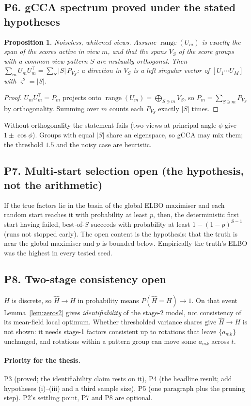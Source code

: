\documentclass[11pt,a4paper]{article}
\newtheorem{proposition}{Proposition}
\theoremstyle{definition}
\theoremstyle{remark}
\begin{document}
\subsection*{P6. gCCA spectrum \hfill\textbf{proved} under the stated hypotheses}
\begin{proposition}\label{prop:gcca}
Noiseless, whitened views. Assume $\operatorname{range}(U_m)$ is exactly the span of the scores active in view $m$, and that
the spans $V_S$ of the score groups with a common view pattern $S$ are mutually orthogonal. Then
$\sum_mU_mU_m^\top=\sum_S|S|\,P_{V_S}$: a direction in $V_S$ is a left singular vector of $[U_1\cdots U_M]$ with $\varsigma^2=|S|$.
\end{proposition}
\begin{proof}
$U_mU_m^\top=P_m$ projects onto $\operatorname{range}(U_m)=\bigoplus_{S\ni m}V_S$, so $P_m=\sum_{S\ni m}P_{V_S}$ by orthogonality. Summing over
$m$ counts each $P_{V_S}$ exactly $|S|$ times. \qedhere
\end{proof}
\noindent Without orthogonality the statement fails (two views at principal angle $\phi$ give $1\pm\cos\phi$). Groups with
equal $|S|$ share an eigenspace, so gCCA may mix them; the threshold $1.5$ and the noisy case are heuristic.

\subsection*{P7. Multi-start selection \hfill\textbf{open} (the hypothesis, not the arithmetic)}
If the true factors lie in the basin of the global ELBO maximiser and each random start reaches it with probability at
least $p$, then, the deterministic first start having failed, best-of-$S$ succeeds with probability at least
$1-(1-p)^{S-1}$ (runs not stopped early). The open content is the hypothesis: that the truth is near the global maximiser
and $p$ is bounded below. Empirically the truth's ELBO was the highest in every tested seed.

\subsection*{P8. Two-stage consistency \hfill\textbf{open}}
$H$ is discrete, so $\hat H\to H$ in probability means $P(\hat H=H)\to1$. On that event Lemma~\ref{lem:zeros2} gives
\emph{identifiability} of the stage-2 model, not consistency of its mean-field local optimum. Whether thresholded
variance shares give $\hat H\to H$ is not shown: it needs stage-1 factors consistent up to rotations that leave $\{a_{mk}\}$
unchanged, and rotations within a pattern group can move some $a_{mk}$ across $t$.

\paragraph{Priority for the thesis.} P3 (proved; the identifiability claim rests on it), P4 (the headline result; add
hypotheses (i)--(iii) and a third sample size), P5 (one paragraph plus the pruning step). P2's settling point, P7 and P8
are optional.
\end{document}
